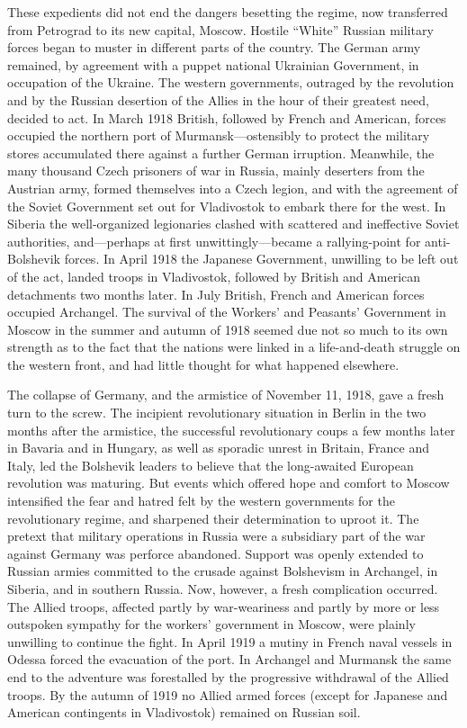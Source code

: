 These expedients did not end the dangers besetting the regime, now transferred from Petrograd to its new capital, Moscow. Hostile ``White'' Russian military forces began to muster in different parts of the country. The German army remained, by agreement with a puppet national Ukrainian Government, in occupation of the Ukraine. The western governments, outraged by the revolution and by the Russian desertion of the Allies in the hour of their greatest need, decided to act. In March 1918 British, followed by French and American, forces occupied the northern port of Murmansk---ostensibly to protect the military stores accumulated there against a further German irruption. Meanwhile, the many thousand Czech prisoners of war in Russia, mainly deserters from the Austrian army, formed themselves into a Czech legion, and with the agreement of the Soviet Government set out for Vladivostok to embark there for the west. In Siberia the well-organized legionaries clashed with scattered and ineffective Soviet authorities, and---perhaps at first unwittingly---became a rallying-point for anti-Bolshevik forces. In April 1918 the Japanese Government, unwilling to be left out of the act, landed troops in Vladivostok, followed by British and American detachments two months later. In July British, French and American forces occupied Archangel. The survival of the Workers' and Peasants' Government in Moscow in the summer and autumn of 1918 seemed due not so much to its own strength as to the fact that the nations were linked in a life-and-death struggle on the western front, and had little thought for what happened elsewhere. 

The collapse of Germany, and the armistice of November 11, 1918, gave a fresh turn to the screw. The incipient revolutionary situation in Berlin in the two months after the armistice, the successful revolutionary coups a few months later in Bavaria and in Hungary, as well as sporadic unrest in Britain, France and Italy, led the Bolshevik leaders to believe that the long-awaited European revolution was maturing. But events which offered hope and comfort to Moscow intensified the fear and hatred felt by the western governments for the revolutionary regime, and sharpened their determination to uproot it. The pretext that military operations in Russia were a subsidiary part of the war against Germany was perforce abandoned. Support was openly extended to Russian armies committed to the crusade against Bolshevism in Archangel, in Siberia, and in southern Russia. Now, however, a fresh complication occurred. The Allied troops, affected partly by war-weariness and partly by more or less outspoken sympathy for the workers' government in Moscow, were plainly unwilling to continue the fight. In April 1919 a mutiny in French naval vessels in Odessa forced the evacuation of the port. In Archangel and Murmansk the same end to the adventure was forestalled by the progressive withdrawal of the Allied troops. By the autumn of 1919 no Allied armed forces (except for Japanese and American contingents in Vladivostok) remained on Russian soil. 

